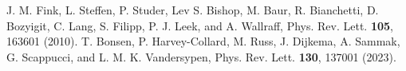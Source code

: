 \documentclass[twocolumn,showpacs,preprintnumbers,amsmath,amssymb]{revtex4}
\begin{document}
\begin{thebibliography}{99}
		J. M. Fink, L. Steffen, P. Studer, Lev S. Bishop, M. Baur, R. Bianchetti, D. Bozyigit, C. Lang, S. Filipp, P. J. Leek, and A. Wallraff,
		Phys. Rev. Lett. \textbf{105}, 163601 (2010).
		T. Bonsen, P. Harvey-Collard, M. Russ, J. Dijkema, A. Sammak, G. Scappucci,
		and L. M. K. Vandersypen,
		Phys. Rev. Lett. \textbf{130}, 137001 (2023).
			
	\end{thebibliography}
	


	
\end{document}
